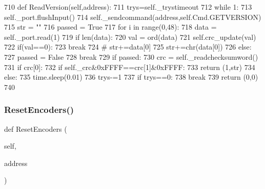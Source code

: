 \begin{DoxyCode}
710     \textcolor{keyword}{def }ReadVersion(self,address):
711         trys=self.\_trystimeout
712         \textcolor{keywordflow}{while} 1:
713             self.\_port.flushInput()
714             self.\_sendcommand(address,self.Cmd.GETVERSION)
715             str = \textcolor{stringliteral}{""}
716             passed = \textcolor{keyword}{True}
717             \textcolor{keywordflow}{for} i \textcolor{keywordflow}{in} range(0,48):
718                 data = self.\_port.read(1)
719                 \textcolor{keywordflow}{if} len(data):
720                     val = ord(data)
721                     self.crc\_update(val)
722                     if(val==0):
723                         \textcolor{keywordflow}{break}
724 \textcolor{comment}{#                   str+=data[0]}
725                     str+=chr(data[0])
726                 \textcolor{keywordflow}{else}:
727                     passed = \textcolor{keyword}{False}
728                     \textcolor{keywordflow}{break}
729             \textcolor{keywordflow}{if} passed:
730                 crc = self.\_readchecksumword()
731                 \textcolor{keywordflow}{if} crc[0]:
732                     \textcolor{keywordflow}{if} self.\_crc&0xFFFF==crc[1]&0xFFFF:
733                         \textcolor{keywordflow}{return} (1,str)
734                     \textcolor{keywordflow}{else}:
735                         time.sleep(0.01)
736             trys-=1
737             \textcolor{keywordflow}{if} trys==0:
738                 \textcolor{keywordflow}{break}
739         \textcolor{keywordflow}{return} (0,0)
740 
\end{DoxyCode}
\mbox{\label{classtoxic__hardware_1_1roboclaw__3_1_1Roboclaw_ad6017e671abf27badfd65aa559a80681}} 
\subsubsection{\texorpdfstring{Reset\+Encoders()}{ResetEncoders()}}
{\footnotesize\ttfamily def Reset\+Encoders (\begin{DoxyParamCaption}\item[{}]{self,  }\item[{}]{address }\end{DoxyParamCaption})}


